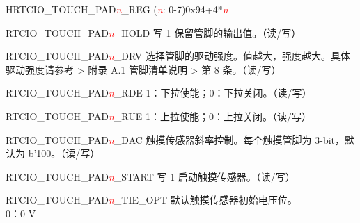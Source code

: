 \begin{register}{H}{RTCIO\_TOUCH\_PAD\textcolor{red}{\it{n}}\_REG (\textcolor{red}{\it{n}}: 0-7)}{0x94+4*\textcolor{red}{\it{n}}}\label{regdesc:RTCIOTOUCHPADnREG} 
%
%
%
%
%
%
%
%
%
%
%
%
%
%
%
%
\regnewline%
\begin{regdesc}\begin{reglist}
\item[RTCIO\_TOUCH\_PAD\textcolor{red}{\it{n}}\_HOLD] 写 1 保留管脚的输出值。（读/写）
\item[RTCIO\_TOUCH\_PAD\textcolor{red}{\it{n}}\_DRV] 选择管脚的驱动强度。值越大，强度越大。具体驱动强度请参考 \linkchipdatasheetCN > 附录 A.1 管脚清单说明 > 第 8 条。（读/写）\\
\item[RTCIO\_TOUCH\_PAD\textcolor{red}{\it{n}}\_RDE] 1：下拉使能；0：下拉关闭。（读/写）
\item[RTCIO\_TOUCH\_PAD\textcolor{red}{\it{n}}\_RUE]  1：上拉使能；0：上拉关闭。（读/写）
\item [RTCIO\_TOUCH\_PAD\textcolor{red}{\it{n}}\_DAC]触摸传感器斜率控制。每个触摸管脚为 3-bit，默认为 b'100。（读/写）
\item [RTCIO\_TOUCH\_PAD\textcolor{red}{\it{n}}\_START] 写 1 启动触摸传感器。（读/写）
\item [RTCIO\_TOUCH\_PAD\textcolor{red}{\it{n}}\_TIE\_OPT] 默认触摸传感器初始电压位。\\
0：0 V\\

\end{reglist}
\end{regdesc}
\end{register}
